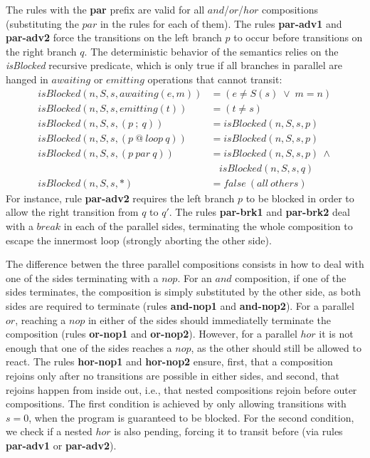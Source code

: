 \documentclass{acm_proc_article-sp}
\newcommand{\rr}[1] {{\textbf{\scriptsize{#1}}}}
\newcommand{\1}{\;}
\newcommand{\2}{\;\;}
\newcommand{\3}{\;\;\;}
\newcommand{\5}{\;\;\;\;\;}
\begin{document}
The rules with the \rr{par} prefix are valid for all $and$/$or$/$hor$ 
compositions (substituting the $par$ in the rules for each of them).
%
The rules \rr{par-adv1} and \rr{par-adv2} force the transitions on the left 
branch $p$ to occur before transitions on the right branch $q$.
%
The deterministic behavior of the semantics relies on the \emph{isBlocked} 
recursive predicate, which is only true if all branches in parallel are hanged 
in $awaiting$ or $emitting$ operations that cannot transit:
%
{\small
\begin{align*}
  isBlocked(n,S,s, awaiting(e,m)) &= (e \neq S(s) \1\vee\1 m = n)   \\
  isBlocked(n,S,s, emitting(t))   &= (t \neq s)                     \\
  isBlocked(n,S,s, (p~;~q))       &= isBlocked(n,S,s,p)             \\
  isBlocked(n,S,s, (p~@~loop~q))  &= isBlocked(n,S,s,p)             \\
  isBlocked(n,S,s, (p~par~q))     &= isBlocked(n,S,s,p)~\wedge \\
                                     &~~~~isBlocked(n,S,s,q)             \\
  isBlocked(n,S,s, *)             &= false~(all~others)
\end{align*}
}%
%
For instance, rule \rr{par-adv2} requires the left branch $p$ to be blocked in 
order to allow the right transition from $q$ to $q'$.
%
The rules \rr{par-brk1} and \rr{par-brk2} deal with a $break$ in each of the 
parallel sides, terminating the whole composition to escape the innermost loop 
(strongly aborting the other side).

The difference betwen the three parallel compositions consists in how to deal 
with one of the sides terminating with a $nop$.
%
For an $and$ composition, if one of the sides terminates, the composition is 
simply substituted by the other side, as both sides are required to terminate 
(rules \rr{and-nop1} and \rr{and-nop2}).
%
For a parallel $or$, reaching a $nop$ in either of the sides should 
immediatelly terminate the composition (rules \rr{or-nop1} and \rr{or-nop2}).
%
However, for a parallel $hor$ it is not enough that one of the sides reaches a 
$nop$, as the other should still be allowed to react.
The rules \rr{hor-nop1} and \rr{hor-nop2} ensure, first, that a composition 
rejoins only after no transitions are possible in either sides, and second, 
that rejoins happen from inside out, i.e., that nested compositions rejoin 
before outer compositions.
The first condition is achieved by only allowing transitions with $s=0$, when 
the program is guaranteed to be blocked.
For the second condition, we check if a nested $hor$ is also pending, forcing 
it to transit before (via rules \textbf{par-adv1} or \textbf{par-adv2}).
\end{document}

